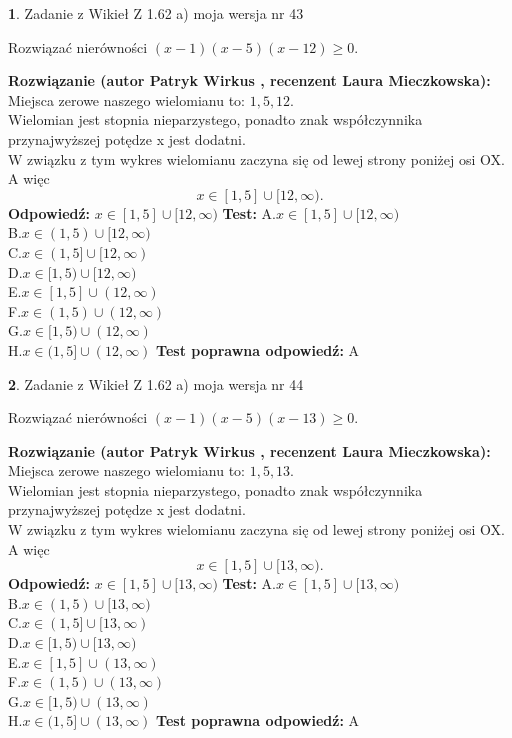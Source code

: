 \documentclass[12pt, a4paper]{article}
\theoremstyle{definition} %
\newtheorem{zad}{}
\newcommand{\zadStart}[1]{\begin{zad}#1\newline}
\newcommand{\zadStop}{\end{zad}}
\newcommand{\rozwStart}[2]{\noindent \textbf{Rozwiązanie (autor #1 , recenzent #2): }\newline}
\newcommand{\rozwStop}{\newline}
\newcommand{\odpStart}{\noindent \textbf{Odpowiedź:}\newline}
\newcommand{\odpStop}{\newline}
\newcommand{\testStart}{\noindent \textbf{Test:}\newline}
\newcommand{\testStop}{\newline}
\newcommand{\kluczStart}{\noindent \textbf{Test poprawna odpowiedź:}\newline}
\newcommand{\kluczStop}{\newline}
\begin{document}
\zadStart{Zadanie z Wikieł Z 1.62 a) moja wersja nr 43}

Rozwiązać nierówności $(x-1)(x-5)(x-12)\ge0$.
\zadStop
\rozwStart{Patryk Wirkus}{Laura Mieczkowska}
Miejsca zerowe naszego wielomianu to: $1, 5, 12$.\\
Wielomian jest stopnia nieparzystego, ponadto znak współczynnika przy\linebreak najwyższej potędze x jest dodatni.\\ W związku z tym wykres wielomianu zaczyna się od lewej strony poniżej osi OX. A więc $$x \in [1,5] \cup [12,\infty).$$
\rozwStop
\odpStart
$x \in [1,5] \cup [12,\infty)$
\odpStop
\testStart
A.$x \in [1,5] \cup [12,\infty)$\\
B.$x \in (1,5) \cup [12,\infty)$\\
C.$x \in (1,5] \cup [12,\infty)$\\
D.$x \in [1,5) \cup [12,\infty)$\\
E.$x \in [1,5] \cup (12,\infty)$\\
F.$x \in (1,5) \cup (12,\infty)$\\
G.$x \in [1,5) \cup (12,\infty)$\\
H.$x \in (1,5] \cup (12,\infty)$
\testStop
\kluczStart
A
\kluczStop



\zadStart{Zadanie z Wikieł Z 1.62 a) moja wersja nr 44}

Rozwiązać nierówności $(x-1)(x-5)(x-13)\ge0$.
\zadStop
\rozwStart{Patryk Wirkus}{Laura Mieczkowska}
Miejsca zerowe naszego wielomianu to: $1, 5, 13$.\\
Wielomian jest stopnia nieparzystego, ponadto znak współczynnika przy\linebreak najwyższej potędze x jest dodatni.\\ W związku z tym wykres wielomianu zaczyna się od lewej strony poniżej osi OX. A więc $$x \in [1,5] \cup [13,\infty).$$
\rozwStop
\odpStart
$x \in [1,5] \cup [13,\infty)$
\odpStop
\testStart
A.$x \in [1,5] \cup [13,\infty)$\\
B.$x \in (1,5) \cup [13,\infty)$\\
C.$x \in (1,5] \cup [13,\infty)$\\
D.$x \in [1,5) \cup [13,\infty)$\\
E.$x \in [1,5] \cup (13,\infty)$\\
F.$x \in (1,5) \cup (13,\infty)$\\
G.$x \in [1,5) \cup (13,\infty)$\\
H.$x \in (1,5] \cup (13,\infty)$
\testStop
\kluczStart
A
\kluczStop
\end{document}

